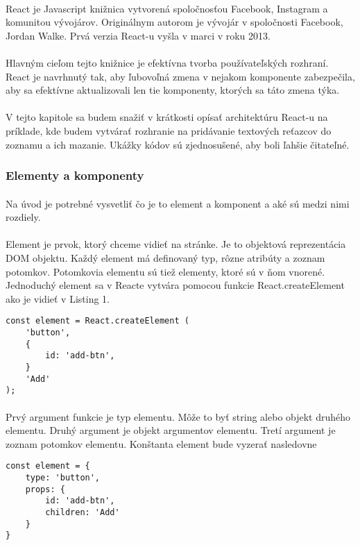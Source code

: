 \paragraph{}
React je Javascript knižnica vytvorená spoločnosťou Facebook, Instagram a komunitou vývojárov. Originálnym autorom je vývojár v spoločnosti Facebook, Jordan Walke. Prvá verzia React-u vyšla v marci v roku 2013. 
\paragraph{}
Hlavným cieľom tejto knižnice je efektívna tvorba používateľských rozhraní. React je navrhnutý tak, aby ľubovoľná zmena v nejakom komponente zabezpečila, aby sa efektívne aktualizovali len tie komponenty, ktorých sa táto zmena týka.
\paragraph{}
V tejto kapitole sa budem snažiť v krátkosti opísať architektúru React-u na príklade, kde budem vytvárať rozhranie na pridávanie textových reťazcov do zoznamu a ich mazanie. Ukážky kódov sú zjednosušené, aby boli ľahšie čitateľné.
\subsubsection{Elementy a komponenty}
\paragraph{}
Na úvod je potrebné vysvetliť čo je to element a komponent a aké sú medzi nimi rozdiely. 
\paragraph{}
Element je prvok, ktorý chceme vidieť na stránke. Je to objektová reprezentácia DOM objektu. Každý element má definovaný typ, rôzne atribúty a zoznam potomkov. Potomkovia elementu sú tiež elementy, ktoré sú v ňom vnorené. Jednoduchý element sa v Reacte vytvára pomocou funkcie React.createElement ako je vidieť v Listing 1.
\begin{lstlisting}[caption=Vytvorenie jednoduchého elementu]
const element = React.createElement (
    'button',
    {
        id: 'add-btn',
    }
    'Add'
);
\end{lstlisting}
\paragraph{}
Prvý argument funkcie je typ elementu. Môže to byť string alebo objekt druhého elementu. Druhý argument je objekt argumentov elementu. Tretí argument je zoznam potomkov elementu. Konštanta element bude vyzerať nasledovne
\begin{lstlisting}
const element = {
    type: 'button',
    props: {
        id: 'add-btn',
        children: 'Add'
    }
}
\end{lstlisting}
